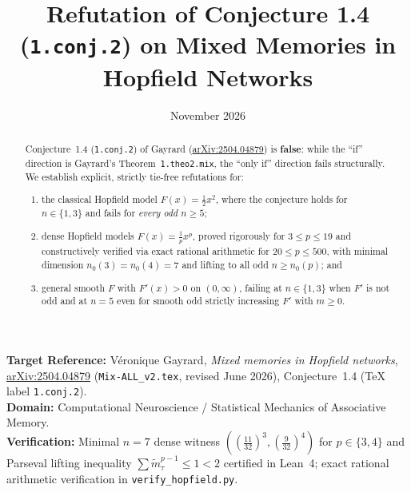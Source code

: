 \documentclass[11pt]{article}
\title{Refutation of Conjecture 1.4 (\texttt{1.conj.2}) on Mixed Memories in Hopfield Networks}
\author{}
\date{November 2026}
\theoremstyle{definition}
\theoremstyle{remark}
\begin{document}
\maketitle

\begin{center}
\small
\textbf{Target Reference:} V\'eronique Gayrard, \emph{Mixed memories in Hopfield networks},
\href{https://arxiv.org/abs/2504.04879}{arXiv:2504.04879} (\texttt{Mix-ALL\_v2.tex}, revised June 2026),
Conjecture~1.4 (\TeX{} label \texttt{1.conj.2}).\\[3pt]
\textbf{Domain:} Computational Neuroscience / Statistical Mechanics of Associative Memory.\\[3pt]
\textbf{Verification:} Minimal $n=7$ dense witness $((\frac{11}{32})^3, (\frac{9}{32})^4)$ for $p\in\{3,4\}$
and Parseval lifting inequality $\sum \tilde{m}_\tau^{p-1} \le 1 < 2$ certified in Lean~4;
exact rational arithmetic verification in \texttt{verify\_hopfield.py}.
\end{center}

\medskip

\begin{abstract}
Conjecture~1.4 (\texttt{1.conj.2}) of Gayrard (\href{https://arxiv.org/abs/2504.04879}{arXiv:2504.04879}) is \textbf{false}: while the ``if'' direction is Gayrard's Theorem~\texttt{1.theo2.mix}, the ``only if'' direction fails structurally. We establish explicit, strictly tie-free refutations for:
\begin{enumerate}[leftmargin=2em,itemsep=2pt]
  \item the classical Hopfield model $F(x) = \frac{1}{2}x^2$, where the conjecture holds for $n \in \{1, 3\}$ and fails for \emph{every odd $n \ge 5$};
  \item dense Hopfield models $F(x) = \frac{1}{p}x^p$, proved rigorously for $3 \le p \le 19$ and constructively verified via exact rational arithmetic for $20 \le p \le 500$, with minimal dimension $n_0(3) = n_0(4) = 7$ and lifting to all odd $n \ge n_0(p)$; and
  \item general smooth $F$ with $F'(x) > 0$ on $(0,\infty)$, failing at $n \in \{1,3\}$ when $F'$ is not odd and at $n = 5$ even for smooth odd strictly increasing $F'$ with $m \ge 0$.
\end{enumerate}
\end{abstract}
\end{document}
